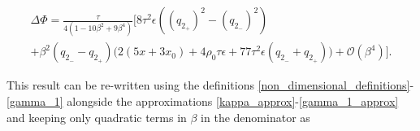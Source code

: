 \documentclass{article}
\begin{document}

\begin{multline}
\Delta \Phi = \frac{\tau }{4 \left(1 -10 \beta ^2 + 9 \beta ^4\right)} 
\Bigg[ 8 \tau ^2 \epsilon \text{} \left( \text{$(q_{2_{+}})$}^2- \text{$(q_{2_{-}})$}^2\right) \\
+ \beta ^2 (\text{$q_{2_{-}}$}-\text{$q_{2_{+}}$}) \bigg(2 \left(5 x+3 x_0\right) +4 \rho _0 \tau  \epsilon + 77\tau ^2 \epsilon  \text{} (\text{$q_{2_{-}}$}+\text{$q_{2_{+}}$})\bigg) 
+ \mathcal{O}(\beta ^4) \Bigg].
\end{multline}

This result can be re-written using the definitions \ref{non_dimensional_definitions}-\ref{gamma_1} alongside the approximations \ref{kappa_approx}-\ref{gamma_1_approx} and keeping only quadratic terms in $\beta$ in the denominator as
\end{document}
